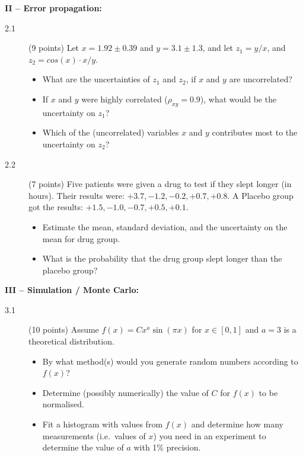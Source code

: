 \documentclass[11pt]{article}
\begin{document}

\vspace{2ex}
\noindent
{\bf II -- Error propagation:}
\begin{description}
\item[2.1] (9 points)
  Let $x = 1.92 \pm 0.39$ and $y = 3.1 \pm 1.3$, and let $z_1 = y/x$, and $z_2 = cos(x) \cdot x/y$.
  \vspace*{-1ex}
  \begin{itemize}
    \item What are the uncertainties of $z_1$ and $z_2$, if $x$ and $y$ are uncorrelated?
    \item If $x$ and $y$ were highly correlated ($\rho_{xy} = 0.9$), what would be the uncertainty on $z_1$?
    \item Which of the (uncorrelated) variables $x$ and $y$ contributes most to the uncertainty on $z_2$?
  \end{itemize}
%
  \item[2.2] (7 points)
    Five patients were given a drug to test if they slept longer (in hours). Their results were:
    $+3.7, -1.2 , -0.2 , +0.7, +0.8$. A Placebo group got the results: $+1.5, -1.0 , -0.7, +0.5, +0.1$.
  \vspace*{-1ex}
  \begin{itemize}
    \item Estimate the mean, standard deviation, and the uncertainty on the mean for drug group.
    \item What is the probability that the drug group slept longer than the placebo group?
  \end{itemize}
\end{description}



\newpage

\noindent
{\bf III -- Simulation / Monte Carlo:}
\begin{description}
  \item[3.1] (10 points)
    Assume $f(x) = C x^a \sin(\pi x)$ for $x \in [0,1]$ and $a=3$ is a theoretical distribution.
  \vspace*{-1ex}
  \begin{itemize}
    \item By what method(s) would you generate random numbers according to $f(x)$?
    \item Determine (possibly numerically) the value of $C$ for $f(x)$ to be normalised.
    \item Fit a histogram with values from $f(x)$ and determine how many measurements (i.e.\ values of $x$)
      you need in an experiment to determine the value of $a$ with 1\% precision.
  \end{itemize}
\end{description}
\end{document}

